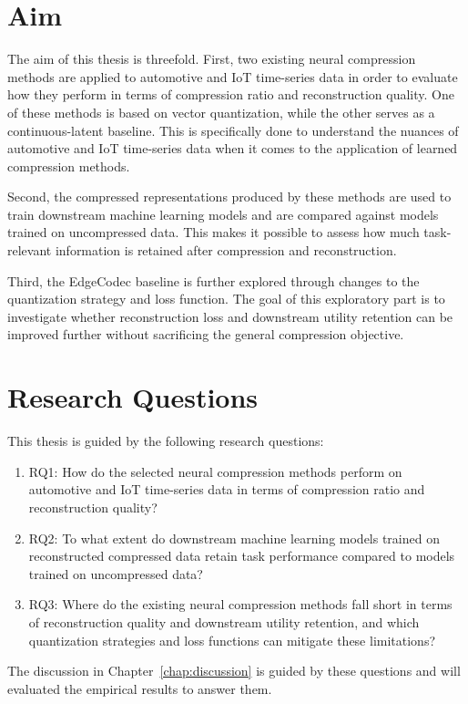 \section{Aim}
The aim of this thesis is threefold. First, two existing neural compression methods are applied to automotive and IoT time-series data in order to evaluate how they perform in terms of compression ratio and reconstruction quality. One of these methods is based on vector quantization, while the other serves as a continuous-latent baseline. This is specifically done to understand the nuances of automotive and IoT time-series data when it comes to the application of learned compression methods. 

Second, the compressed representations produced by these methods are used to train downstream machine learning models and are compared against models trained on uncompressed data. This makes it possible to assess how much task-relevant information is retained after compression and reconstruction.

Third, the EdgeCodec baseline is further explored through changes to the quantization strategy and loss function. The goal of this exploratory part is to investigate whether reconstruction loss and downstream utility retention can be improved further without sacrificing the general compression objective.

\section{Research Questions}
This thesis is guided by the following research questions:

\begin{enumerate}
	\item RQ1: How do the selected neural compression methods perform on automotive and IoT time-series data in terms of compression ratio and reconstruction quality?
	\item RQ2: To what extent do downstream machine learning models trained on reconstructed compressed data retain task performance compared to models trained on uncompressed data?
	\item RQ3: Where do the existing neural compression methods fall short in terms of reconstruction quality and downstream utility retention, and which quantization strategies and loss functions can mitigate these limitations?
\end{enumerate}

The discussion in Chapter~\ref{chap:discussion} is guided by these questions and will evaluated the empirical results to answer them. 

